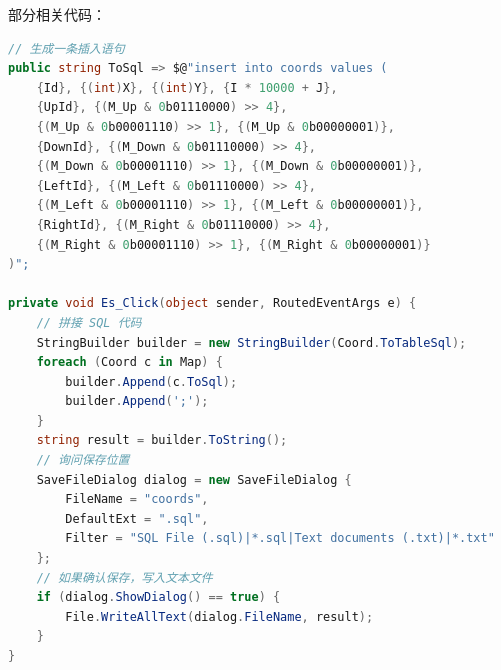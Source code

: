 部分相关代码：

\begin{lstlisting}[language=cs]
// 生成一条插入语句
public string ToSql => $@"insert into coords values (
    {Id}, {(int)X}, {(int)Y}, {I * 10000 + J},
    {UpId}, {(M_Up & 0b01110000) >> 4},
    {(M_Up & 0b00001110) >> 1}, {(M_Up & 0b00000001)},
    {DownId}, {(M_Down & 0b01110000) >> 4},
    {(M_Down & 0b00001110) >> 1}, {(M_Down & 0b00000001)},
    {LeftId}, {(M_Left & 0b01110000) >> 4},
    {(M_Left & 0b00001110) >> 1}, {(M_Left & 0b00000001)},
    {RightId}, {(M_Right & 0b01110000) >> 4},
    {(M_Right & 0b00001110) >> 1}, {(M_Right & 0b00000001)}
)";

private void Es_Click(object sender, RoutedEventArgs e) {
    // 拼接 SQL 代码
    StringBuilder builder = new StringBuilder(Coord.ToTableSql);
    foreach (Coord c in Map) {
        builder.Append(c.ToSql);
        builder.Append(';');
    }
    string result = builder.ToString();
    // 询问保存位置
    SaveFileDialog dialog = new SaveFileDialog {
        FileName = "coords",
        DefaultExt = ".sql",
        Filter = "SQL File (.sql)|*.sql|Text documents (.txt)|*.txt"
    };
    // 如果确认保存，写入文本文件
    if (dialog.ShowDialog() == true) {
        File.WriteAllText(dialog.FileName, result);
    }
}
\end{lstlisting}
